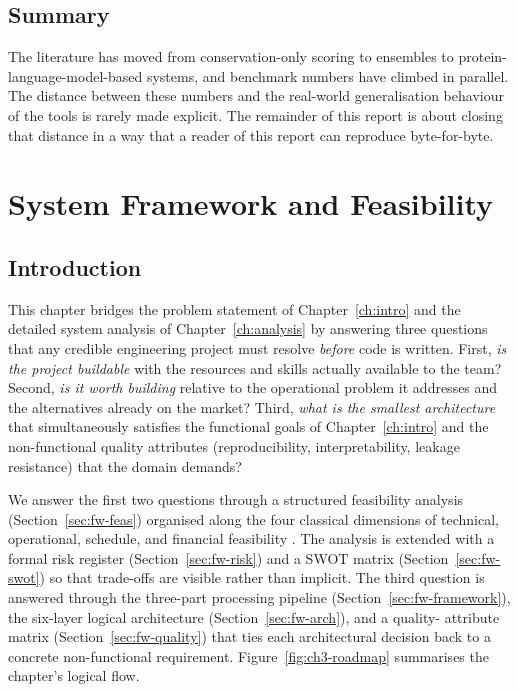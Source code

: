 \documentclass[11pt,a4paper,oneside]{report}
\begin{document}
\section{Summary}
\label{sec:rw-summary}

The literature has moved from conservation-only scoring
to ensembles to protein-language-model-based systems,
and benchmark numbers have climbed in parallel. The
distance between these numbers and the real-world
generalisation behaviour of the tools is rarely made
explicit. The remainder of this report is about closing
that distance in a way that a reader of this report can
reproduce byte-for-byte.


\chapter{System Framework and Feasibility}
\label{ch:framework}

\section{Introduction}
\label{sec:fw-intro}

This chapter bridges the problem statement of
Chapter~\ref{ch:intro} and the detailed system analysis of
Chapter~\ref{ch:analysis} by answering three questions that
any credible engineering project must resolve \emph{before}
code is written. First, \emph{is the project buildable} with
the resources and skills actually available to the team?
Second, \emph{is it worth building} relative to the operational
problem it addresses and the alternatives already on the
market? Third, \emph{what is the smallest architecture} that
simultaneously satisfies the functional goals of
Chapter~\ref{ch:intro} and the non-functional quality
attributes (reproducibility, interpretability, leakage
resistance) that the domain demands?

We answer the first two questions through a structured
feasibility analysis (Section~\ref{sec:fw-feas}) organised
along the four classical dimensions of technical,
operational, schedule, and financial feasibility
\citep{whitten2007sysanalysis}. The analysis is extended with
a formal risk register (Section~\ref{sec:fw-risk}) and a SWOT
matrix (Section~\ref{sec:fw-swot}) so that trade-offs are
visible rather than implicit. The third question is answered
through the three-part processing pipeline
(Section~\ref{sec:fw-framework}), the six-layer logical
architecture (Section~\ref{sec:fw-arch}), and a quality-
attribute matrix (Section~\ref{sec:fw-quality}) that ties each
architectural decision back to a concrete non-functional
requirement. Figure~\ref{fig:ch3-roadmap} summarises the
chapter's logical flow.
\end{document}
